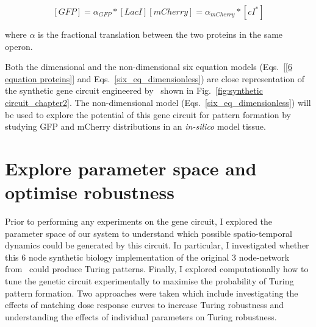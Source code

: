 \begin{subequations}
    \begin{equation}
        [GFP] = \alpha_{GFP}*[LacI]
    \end{equation}
    \begin{equation}
        [mCherry] = \alpha_{mCherry}*[cI^*]
    \end{equation}
    \label{linear_fluorescence}
\end{subequations}

where $\alpha$ is the fractional translation between the two proteins in the same operon.


Both the dimensional and the non-dimensional six equation models (Eqs.~\ref{[6 equation proteins]} and Eqs.~\ref{six_eq_dimensionless}) are close representation of the synthetic gene circuit engineered by~\cite{Tica2020} shown in Fig.~\ref{fig:synthetic circuit_chapter2}.
The non-dimensional model (Eqs.~\ref{six_eq_dimensionless}) will be used to explore the potential of this gene circuit for pattern formation by studying GFP and mCherry distributions in an \textit{in-silico} model tissue.



\section{Explore parameter space and optimise robustness}
Prior to performing any experiments on the gene circuit, I explored the parameter space of our system to understand which possible spatio-temporal dynamics could be generated by this circuit.
In particular, I investigated whether this 6 node synthetic biology implementation of the original 3 node-network from~\cite{Scholes2019} could produce Turing patterns.
Finally, I explored computationally how to tune the genetic circuit experimentally to maximise the probability of Turing pattern formation.
Two approaches were taken which include investigating the effects of matching dose response curves to increase Turing robustness and understanding the effects of individual parameters on Turing robustness.

